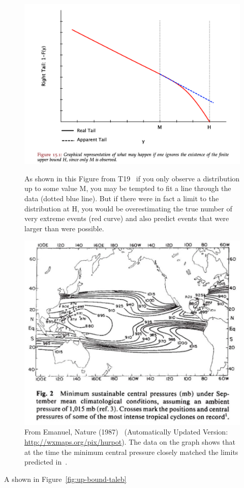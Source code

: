 \begin{figure}[htb!]
    \centering
    \includegraphics[width=1\linewidth]{images/nnt-upper-bound.png}
    \vspace{-15pt}
   \caption{As shown in this Figure from T19~\cite{taleb2019statistical} if you only
   observe a distribution up to some value M, you may be tempted to fit a line through the
   data (dotted blue line). But if there were in fact a limit to the distribution at H,
   you would be overestimating the true number of very extreme events (red curve) and also predict
   events that were larger than were possible.  }
   \label{fig:up-bound-taleb}
   \includegraphics[width=1\linewidth]{images/hurricane-Emanuel-upper-bound.png}
   \vspace{-15pt}
  \caption{From Emanuel, Nature (1987)~\cite{emanuel1987dependence}
  (Automatically Updated Version: \url{http://wxmaps.org/pix/hurpot}).
  The data on the graph shows that at the time the minimum central pressure
  closely matched the limits predicted in~\cite{emanuel1986air}. }
   \label{fig:emanuel87}

\end{figure}

A shown in Figure~\ref{fig:up-bound-taleb}
